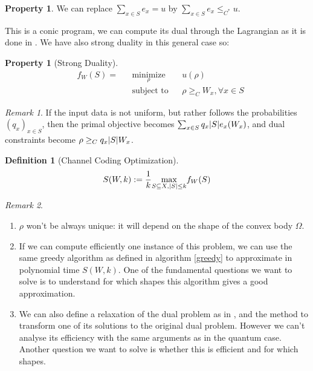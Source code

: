 \documentclass{article}
\theoremstyle{definition}
\newtheorem{prop}[theo]{Property}
\newtheorem{defi}[theo]{Definition}
\theoremstyle{remark}
\newtheorem*{rk}{Remark}
\DeclareMathOperator{\mini}{\text{minimize}}
\DeclareMathOperator{\st}{\text{subject to}}
\begin{document}
\begin{prop}
  We can replace $\underset{x \in S}{\sum} e_x = u$ by $\underset{x \in S}{\sum} e_x \leq_{C^*} u$.
\end{prop}

This is a conic program, we can compute its dual through the Lagrangian as it is done in \cite{BKK16}. We have also strong duality in this general case so:

\begin{prop}[Strong Duality]
  \begin{equation}
    \begin{aligned}
      &f_W(S) =&& \underset{\rho}{\mini} && u(\rho) \\
      &&& \st && \rho \geq_C  W_x, \forall x \in S
      \end{aligned}
  \end{equation}
\end{prop}

\begin{rk}
  If the input data is not uniform, but rather follows the probabilities $(q_x)_{x \in S}$, then the primal objective becomes $\sum_{x \in S} q_x\abs{S}e_x(W_x)$, and dual constraints become $\rho \geq_C q_x\abs{S} W_x$.
\end{rk}

\begin{defi}[Channel Coding Optimization]
  \[ S(W,k) := \frac{1}{k} \underset{S \subseteq X, \abs{S} \leq k}{\max} f_W(S) \]
\end{defi}

\begin{rk}
  \begin{enumerate}
  \item $\rho$ won't be always unique: it will depend on the shape of the convex body $\Omega$.
  \item If we can compute efficiently one instance of this problem, we can use the same greedy algorithm as defined in algorithm \ref{greedy} to approximate in polynomial time $S(W,k)$. One of the fundamental questions we want to solve is to understand for which shapes this algorithm gives a good approximation.
  \item We can also define a relaxation of the dual problem as in \cite{FSS19}, and the method to transform one of its solutions to the original dual problem. However we can't analyse its efficiency with the same arguments as in the quantum case. Another question we want to solve is whether this is efficient and for which shapes.
  \end{enumerate}
\end{rk}
\end{document}
